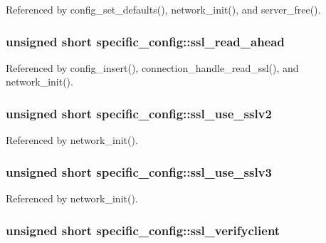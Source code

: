 Referenced by config\-\_\-set\-\_\-defaults(), network\-\_\-init(), and server\-\_\-free().

\hypertarget{structspecific__config_aa025af6d7a5daad4ef02910516eea930}{
\subsubsection[{ssl\-\_\-read\-\_\-ahead}]{\setlength{\rightskip}{0pt plus 5cm}unsigned short specific\-\_\-config\-::ssl\-\_\-read\-\_\-ahead}}\label{structspecific__config_aa025af6d7a5daad4ef02910516eea930}


Referenced by config\-\_\-insert(), connection\-\_\-handle\-\_\-read\-\_\-ssl(), and network\-\_\-init().

\hypertarget{structspecific__config_a5949f421dc6a58473b4805ce95ab1606}{
\subsubsection[{ssl\-\_\-use\-\_\-sslv2}]{\setlength{\rightskip}{0pt plus 5cm}unsigned short specific\-\_\-config\-::ssl\-\_\-use\-\_\-sslv2}}\label{structspecific__config_a5949f421dc6a58473b4805ce95ab1606}


Referenced by network\-\_\-init().

\hypertarget{structspecific__config_acc3e5c4fa553cd799eca498b787e3d12}{
\subsubsection[{ssl\-\_\-use\-\_\-sslv3}]{\setlength{\rightskip}{0pt plus 5cm}unsigned short specific\-\_\-config\-::ssl\-\_\-use\-\_\-sslv3}}\label{structspecific__config_acc3e5c4fa553cd799eca498b787e3d12}


Referenced by network\-\_\-init().

\hypertarget{structspecific__config_af5d7a81fb26d0388671dffa83c77ad48}{
\subsubsection[{ssl\-\_\-verifyclient}]{\setlength{\rightskip}{0pt plus 5cm}unsigned short specific\-\_\-config\-::ssl\-\_\-verifyclient}}\label{structspecific__config_af5d7a81fb26d0388671dffa83c77ad48}


